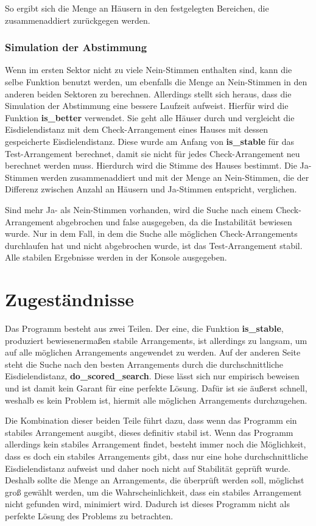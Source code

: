 \documentclass[a4paper,10pt,ngerman]{scrartcl}
\begin{document}
\medskip
So ergibt sich die Menge an Häusern in den festgelegten Bereichen, die zusammenaddiert zurückgegen werden.

\subsubsection{Simulation der Abstimmung}
Wenn im ersten Sektor nicht zu viele Nein-Stimmen enthalten sind, kann die selbe Funktion benutzt werden, um ebenfalls die Menge an Nein-Stimmen in den anderen beiden Sektoren zu berechnen.
Allerdings stellt sich heraus, dass die Simulation der Abstimmung eine bessere Laufzeit aufweist.
Hierfür wird die Funktion \textbf{is\_better} verwendet.
Sie geht alle Häuser durch und vergleicht die Eisdielendistanz mit dem Check-Arrangement eines Hauses mit dessen gespeicherte Eisdielendistanz.
Diese wurde am Anfang von \textbf{is\_stable} für das Test-Arrangement berechnet, damit sie nicht für jedes Check-Arrangement neu berechnet werden muss.
Hierdurch wird die Stimme des Hauses bestimmt.
Die Ja-Stimmen werden zusammenaddiert und mit der Menge an Nein-Stimmen, die der Differenz zwischen Anzahl an Häusern und Ja-Stimmen entspricht, verglichen.

\medskip
Sind mehr Ja- als Nein-Stimmen vorhanden, wird die Suche nach einem Check-Arrangement abgebrochen und false ausgegeben, da die Instabilität bewiesen wurde.
Nur in dem Fall, in dem die Suche alle möglichen Check-Arrangements durchlaufen hat und nicht abgebrochen wurde, ist das Test-Arrangement stabil.
Alle stabilen Ergebnisse werden in der Konsole ausgegeben.

\section{Zugeständnisse}
Das Programm besteht aus zwei Teilen.
Der eine, die Funktion \textbf{is\_stable}, produziert bewiesenermaßen stabile Arrangements, ist allerdings zu langsam, um auf alle möglichen Arrangements angewendet zu werden.
Auf der anderen Seite steht die Suche nach den besten Arrangements durch die durchschnittliche Eisdielendistanz, \textbf{do\_scored\_search}.
Diese lässt sich nur empirisch beweisen und ist damit kein Garant für eine perfekte Lösung.
Dafür ist sie äußerst schnell, weshalb es kein Problem ist, hiermit alle möglichen Arrangements durchzugehen.

Die Kombination dieser beiden Teile führt dazu, dass wenn das Programm ein stabiles Arrangement ausgibt, dieses definitiv stabil ist.
Wenn das Programm allerdings kein stabiles Arrangement findet, besteht immer noch die Möglichkeit, dass es doch ein stabiles Arrangements gibt, dass nur eine hohe durchschnittliche Eisdielendistanz aufweist und daher noch nicht auf Stabilität geprüft wurde.
Deshalb sollte die Menge an Arrangements, die überprüft werden soll, möglichst groß gewählt werden, um die Wahrscheinlichkeit, dass ein stabiles Arrangement nicht gefunden wird, minimiert wird.
Dadurch ist dieses Programm nicht als perfekte Lösung des Problems zu betrachten.
\end{document}
